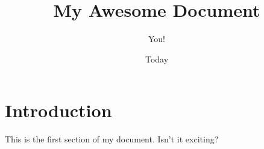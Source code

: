 \documentclass{article}
\title{My Awesome Document}
\author{You!}
\date{Today}
\begin{document}
\maketitle

\section{Introduction}
This is the first section of my document. Isn't it exciting?
\end{document}
